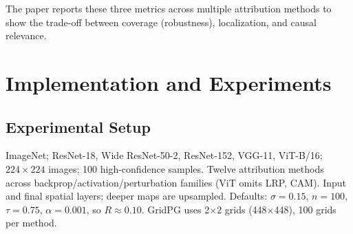 \documentclass[11pt]{article}
\begin{document}
The paper reports these three metrics across multiple attribution methods to show the trade-off between coverage (robustness), localization, and causal relevance.




\section{Implementation and Experiments}

\subsection{Experimental Setup}
ImageNet; ResNet-18, Wide ResNet-50-2, ResNet-152, VGG-11, ViT-B/16; $224\times224$ images; 100 high-confidence samples. Twelve attribution methods across backprop/activation/perturbation families (ViT omits LRP, CAM). Input and final spatial layers; deeper maps are upsampled. Defaults: $\sigma=0.15$, $n=100$, $\tau=0.75$, $\alpha=0.001$, so $R\approx0.10$. GridPG uses 2$\times$2 grids (448$\times$448), 100 grids per method.
\end{document}
